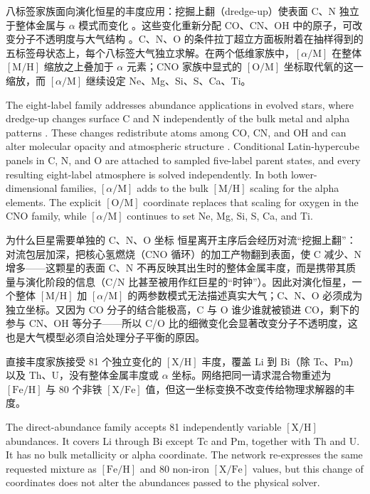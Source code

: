 八标签家族面向演化恒星的丰度应用：挖掘上翻（dredge-up）使表面 C、N 独立于整体金属与 $\alpha$ 模式而变化 \citep{Salaris2015,Martig2016}。这些变化重新分配 CO、CN、OH 中的原子，可改变分子不透明度与大气结构 \citep{Tsuji1973,Gustafsson2008}。C、N、O 的条件拉丁超立方面板附着在抽样得到的五标签母状态上，每个八标签大气独立求解。在两个低维家族中，$[\alpha/\mathrm{M}]$ 在整体 $[\mathrm{M}/\mathrm{H}]$ 缩放之上叠加于 $\alpha$ 元素；CNO 家族中显式的 $[\mathrm{O}/\mathrm{M}]$ 坐标取代氧的这一缩放，而 $[\alpha/\mathrm{M}]$ 继续设定 Ne、Mg、Si、S、Ca、Ti。

\begin{EN}
The eight-label family addresses abundance applications in evolved stars,
where dredge-up changes surface C and N independently of the bulk metal and
alpha patterns \citep{Salaris2015,Martig2016}. These changes redistribute
atoms among CO, CN, and OH and can alter molecular opacity and atmospheric
structure \citep{Tsuji1973,Gustafsson2008}. Conditional Latin-hypercube
panels in C, N, and O are attached to sampled five-label parent states, and
every resulting eight-label atmosphere is solved independently.
In both lower-dimensional families, $[\alpha/\mathrm{M}]$ adds to the bulk
$[\mathrm{M}/\mathrm{H}]$ scaling for the alpha elements. The explicit
$[\mathrm{O}/\mathrm{M}]$ coordinate replaces that scaling for oxygen in the
CNO family, while $[\alpha/\mathrm{M}]$ continues to set Ne, Mg, Si, S, Ca,
and Ti.
\end{EN}

\begin{physbox}{为什么巨星需要单独的 C、N、O 坐标}
恒星离开主序后会经历对流“挖掘上翻”：对流包层加深，把核心氢燃烧（CNO 循环）的加工产物翻到表面，使 C 减少、N 增多——这颗星的表面 C、N 不再反映其出生时的整体金属丰度，而是携带其质量与演化阶段的信息（C/N 比甚至被用作红巨星的“时钟”）。因此对演化恒星，一个整体 $[\mathrm{M}/\mathrm{H}]$ 加 $[\alpha/\mathrm{M}]$ 的两参数模式无法描述真实大气；C、N、O 必须成为独立坐标。又因为 CO 分子的结合能极高，C 与 O 谁少谁就被锁进 CO，剩下的参与 CN、OH 等分子——所以 C/O 比的细微变化会显著改变分子不透明度，这也是大气模型必须自洽处理分子平衡的原因。
\end{physbox}

直接丰度家族接受 81 个独立变化的 $[\mathrm{X}/\mathrm{H}]$ 丰度，覆盖 Li 到 Bi（除 Tc、Pm）以及 Th、U，没有整体金属丰度或 $\alpha$ 坐标。网络把同一请求混合物重述为 $[\mathrm{Fe}/\mathrm{H}]$ 与 80 个非铁 $[\mathrm{X}/\mathrm{Fe}]$ 值，但这一坐标变换不改变传给物理求解器的丰度。

\begin{EN}
The direct-abundance family accepts 81 independently variable
$[\mathrm{X}/\mathrm{H}]$ abundances. It covers Li through Bi except Tc and Pm,
together with Th and U. It has no bulk
metallicity or alpha coordinate. The network re-expresses the same requested
mixture as $[\mathrm{Fe}/\mathrm{H}]$ and 80 non-iron
$[\mathrm{X}/\mathrm{Fe}]$ values, but this change of coordinates does not alter
the abundances passed to the physical solver.
\end{EN}

